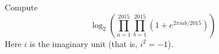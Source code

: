 Compute
\[
\log_2 \left( \prod_{a=1}^{2015} \prod_{b=1}^{2015} (1+e^{2\pi i a b/2015}) \right)
\]
Here $i$ is the imaginary unit (that is, $i^2=-1$). 
